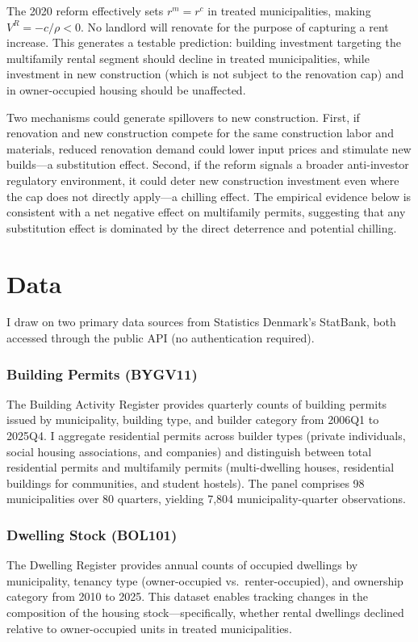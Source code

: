 \documentclass[12pt]{article}
\begin{document}
The 2020 reform effectively sets $r^m = r^c$ in treated municipalities, making $V^R = -c/\rho < 0$. No landlord will renovate for the purpose of capturing a rent increase. This generates a testable prediction: building investment targeting the multifamily rental segment should decline in treated municipalities, while investment in new construction (which is not subject to the renovation cap) and in owner-occupied housing should be unaffected.

Two mechanisms could generate spillovers to new construction. First, if renovation and new construction compete for the same construction labor and materials, reduced renovation demand could lower input prices and stimulate new builds---a substitution effect. Second, if the reform signals a broader anti-investor regulatory environment, it could deter new construction investment even where the cap does not directly apply---a chilling effect. The empirical evidence below is consistent with a net negative effect on multifamily permits, suggesting that any substitution effect is dominated by the direct deterrence and potential chilling.

\section{Data}

I draw on two primary data sources from Statistics Denmark's StatBank, both accessed through the public API (no authentication required).

\subsubsection*{Building Permits (BYGV11)} The Building Activity Register provides quarterly counts of building permits issued by municipality, building type, and builder category from 2006Q1 to 2025Q4. I aggregate residential permits across builder types (private individuals, social housing associations, and companies) and distinguish between total residential permits and multifamily permits (multi-dwelling houses, residential buildings for communities, and student hostels). The panel comprises 98 municipalities over 80 quarters, yielding 7,804 municipality-quarter observations.

\subsubsection*{Dwelling Stock (BOL101)} The Dwelling Register provides annual counts of occupied dwellings by municipality, tenancy type (owner-occupied vs.\ renter-occupied), and ownership category from 2010 to 2025. This dataset enables tracking changes in the composition of the housing stock---specifically, whether rental dwellings declined relative to owner-occupied units in treated municipalities.
\end{document}
